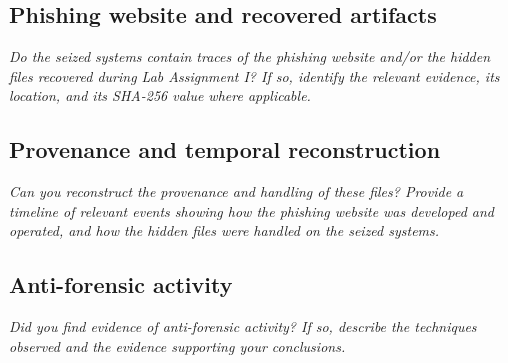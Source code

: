 \documentclass[11pt,a4paper,final,oneside]{article}
\begin{document}
\subsection{Phishing website and recovered artifacts}

\textit{Do the seized systems contain traces of the phishing website and/or the hidden files recovered during Lab Assignment I? If so, identify the relevant evidence, its location, and its SHA-256 value where applicable.}



\subsection{Provenance and temporal reconstruction}

\textit{Can you reconstruct the provenance and handling of these files? Provide a timeline of relevant events showing how the phishing website was developed and operated, and how the hidden files were handled on the seized systems.}



\subsection{Anti-forensic activity}

\textit{Did you find evidence of anti-forensic activity? If so, describe the techniques observed and the evidence supporting your conclusions.}

\end{document}
